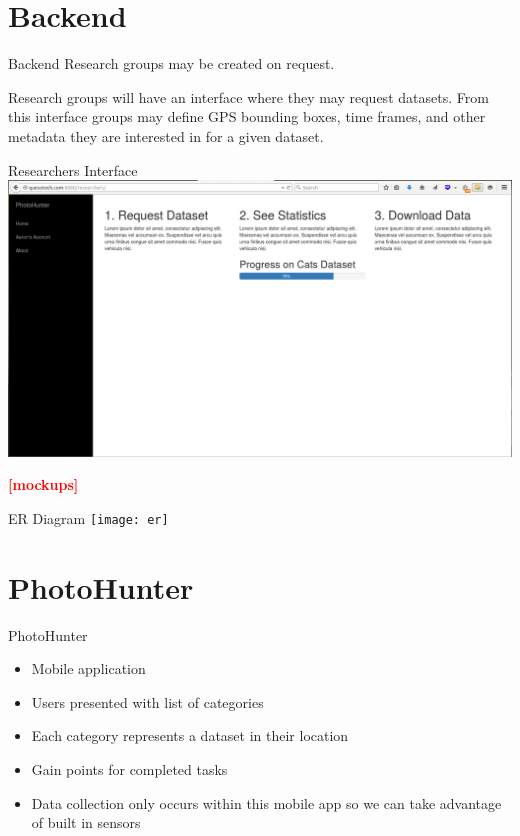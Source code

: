 \documentclass[aspectratio=169]{beamer}
\newcommand{\todo}[1]{\textcolor{red}{\textbf{[#1]}}}
\begin{document}
\section{Backend}

\begin{frame}{Backend}
  Research groups may be created on request. 

  Research groups will have an interface where they may request
  datasets. From this interface groups may define GPS bounding boxes,
  time frames, and other metadata they are interested in for a given
  dataset.
\end{frame}

\begin{frame}{Researchers Interface}
  \centering
  \includegraphics[width=\textwidth,height=\textheight,keepaspectratio]{researchers}
\end{frame}

\begin{frame}
  \todo{mockups}
\end{frame}

\begin{frame}{ER Diagram}
  \centering
  \texttt{[image: er]}
\end{frame}

\section{PhotoHunter}

\begin{frame}{PhotoHunter}
  \begin{itemize}
    
    \item Mobile application

    \item Users presented with list of categories

    \item Each category represents a dataset in their location

    \item Gain points for completed tasks

    \item Data collection only occurs within this mobile app so
          we can take advantage of built in sensors

  \end{itemize}
\end{frame}
\end{document}
